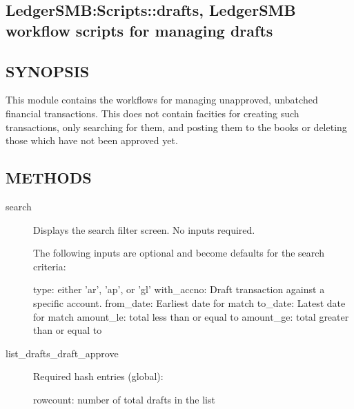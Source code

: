 \begin{description}
\section{LedgerSMB:Scripts::drafts, LedgerSMB workflow scripts for managing drafts\label{LedgerSMB:Scripts::drafts_LedgerSMB_workflow_scripts_for_managing_drafts}}




\subsection*{SYNOPSIS\label{LedgerSMB:Scripts::drafts_LedgerSMB_workflow_scripts_for_managing_drafts_SYNOPSIS}}


This module contains the workflows for managing unapproved, unbatched financial 
transactions.  This does not contain facities for creating such transactions, 
only searching for them, and posting them to the books or deleting those
which have not been approved yet.

\subsection*{METHODS\label{LedgerSMB:Scripts::drafts_LedgerSMB_workflow_scripts_for_managing_drafts_METHODS}}
\begin{description}

\item[{search}] \mbox{}

Displays the search filter screen.  No inputs required.



The following inputs are optional and become defaults for the search criteria:



type:  either 'ar', 'ap', or 'gl'
with\_accno: Draft transaction against a specific account.
from\_date:  Earliest date for match
to\_date: Latest date for match
amount\_le: total less than or equal to
amount\_ge: total greater than or equal to


\item[{list\_drafts\_draft\_approve}] \mbox{}

Required hash entries (global):



rowcount: number of total drafts in the list




\end{description}
\end{description}
